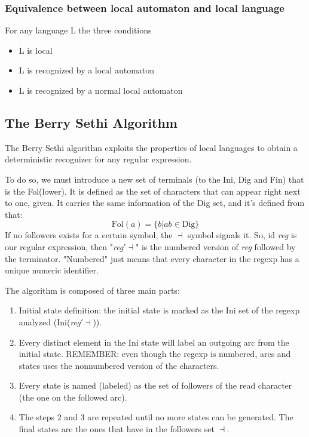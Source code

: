 			\subsubsection{Equivalence between local automaton and local language}
				For any language L the three conditions
				\begin{itemize}
					\item L is local
					\item L is recognized by a local automaton
					\item L is recognized by a normal local automaton
				\end{itemize}
		
		\subsection{The Berry Sethi Algorithm}
			The Berry Sethi algorithm exploits the properties of local languages to obtain a deterministic recognizer for any regular expression.

			To do so, we must introduce a new set of terminals (to the Ini, Dig and Fin) that is the Fol(lower). It is defined as the set of characters that can 
			appear right next to one, given. It carries the same information of the Dig set, and it's defined from that:
			\begin{equation}
				\text{Fol}(a) = \{ b \vert ab \in \text{Dig} \}
			\end{equation}
			If no followers exists for a certain symbol, the $\dashv$ symbol signals it. So, id \emph{reg} is our regular expression, then "\emph{reg}$\prime \dashv$" 
			is the numbered version of \emph{reg} followed by the terminator. "Numbered" just means that every character in the regexp has a unique numeric identifier.

			The algorithm is composed of three main parts:
			\begin{enumerate}
				\item Initial state definition: the initial state is marked as the Ini set of the regexp analyzed (Ini(\emph{reg}$\prime \dashv$)).
				\item Every distinct element in the Ini state will label an outgoing arc from the initial state. REMEMBER: even though the regexp is numbered, 
				arcs and states uses the nonnumbered version of the characters. 
				\item Every state is named (labeled) as the set of followers of the read character (the one on the followed arc). 
				\item The steps 2 and 3 are repeated until no more states can be generated. The final states are the ones that have in the followers set $\dashv$.
			\end{enumerate}
			
